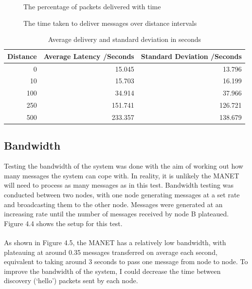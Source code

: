 \documentclass[12pt,a4paper]{report}
\begin{document}
\begin{figure}[h]
\begin{center}

\end{center}
\caption{The percentage of packets delivered with time}
\end{figure}

\begin{figure}[h]
\begin{center}

\end{center}
\caption{The time taken to deliver messages over distance intervals}
\end{figure}
\begin{table}[h]
\begin{center}
\begin{tabular}{ |r|r|r| } 
\hline
Distance & Average Latency /Seconds & Standard Deviation /Seconds \\ 
\hline
0 & 15.045 & 13.796 \\ 
\hline
10 & 15.703 & 16.199 \\ 
\hline
100 & 34.914 & 37.966 \\ 
\hline
250 & 151.741 & 126.721 \\ 
\hline
500 & 233.357 & 138.679 \\ 
\hline
\end{tabular}
\end{center}
\caption{Average delivery and standard deviation in seconds}
\end{table} 





\subsection{Bandwidth}
Testing the bandwidth of the system was done with the aim of working out how many messages the system can cope with. In reality, it is unlikely the MANET will need to process as many messages as in this test. Bandwidth testing was conducted between two nodes, with one node generating messages at a set rate and broadcasting them to the other node. Messages were generated at an increasing rate until the number of messages received by node B plateaued. Figure 4.4 shows the setup for this test. \\ \\
As shown in Figure 4.5, the MANET has a relatively low bandwidth, with plateauing at around 0.35 messages transferred on average each second, equivalent to taking around 3 seconds to pass one message from node to node. To improve the bandwidth of the system, I could decrease the time between discovery (`hello') packets sent by each node. 
\end{document}
